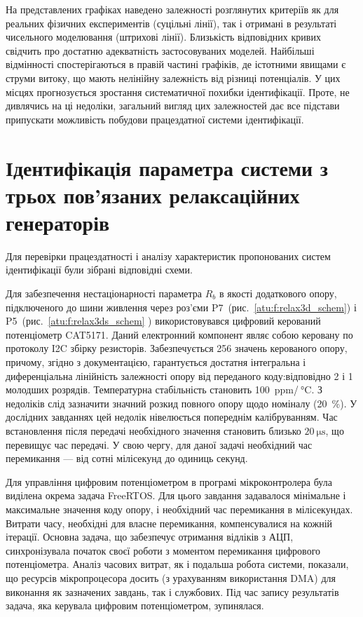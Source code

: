 На представлених графіках наведено залежності розглянутих
критеріїв як для реальних фізичних експериментів (суцільні
лінії), так і отримані в результаті чисельного моделювання
(штрихові лінії). Близькість відповідних кривих свідчить про
достатню адекватність застосовуваних моделей. Найбільші
відмінності спостерігаються в правій частині графіків,
де істотними явищами є струми витоку, що мають нелінійну
залежність від різниці потенціалів. У цих місцях прогнозується
зростання систематичної похибки ідентифікації. Проте, не
дивлячись на ці недоліки, загальний вигляд цих залежностей
дає все підстави припускати можливість побудови працездатної
системи ідентифікації.


\section{Ідентифікація параметра системи з трьох пов'язаних релаксаційних генераторів}

Для перевірки працездатності і аналізу характеристик
пропонованих систем ідентифікації були зібрані відповідні
схеми.

Для забезпечення нестаціонарності параметра
$R_b$ в якості додаткового опору, підключеного до шини живлення
через роз'єми P7~(рис.~\ref{atu:f:relax3d_schem}) і P5~(рис.~\ref{atu:f:relax3ds_schem} )
використовувався цифровий керований потенціометр CAT5171. Даний
електронний компонент являє собою керовану по протоколу
I2C збірку резисторів. Забезпечується 256 значень керованого
опору, причому, згідно з документацією, гарантується достатня
інтегральна і диференціальна лінійність залежності опору від
переданого коду:відповідно 2 і 1 молодших розрядів. Температурна
стабільність становить 100~ppm/${}\SI{}{\celsius} $.
З недоліків слід зазначити значний розкид повного
опору щодо номіналу (20~\%). У дослідних завданнях цей недолік
нівелюється попереднім калібруванням. Час встановлення після
передачі необхідного значення становить близько
$\SI{20}{\micro \second} $, що перевищує час передачі. У свою чергу, для
даної задачі необхідний час перемикання --- від сотні
мілісекунд до одиниць секунд.

Для управління цифровим потенціометром в програмі
мікроконтролера була виділена окрема задача FreeRTOS. Для цього
завдання задавалося мінімальне і максимальне значення коду
опору, і необхідний час перемикання в мілісекундах. Витрати часу,
необхідні для власне перемикання, компенсувалися на кожній
ітерації. Основна задача, що забезпечує отримання відліків з
АЦП, синхронізувала початок своєї роботи з моментом перемикання
цифрового потенціометра. Аналіз часових витрат, як і подальша
робота системи, показали, що ресурсів мікропроцесора досить
(з урахуванням використання DMA) для виконання як зазначених
завдань, так і службових. Під час запису результатів задача,
яка керувала цифровим потенціометром, зупинялася.


